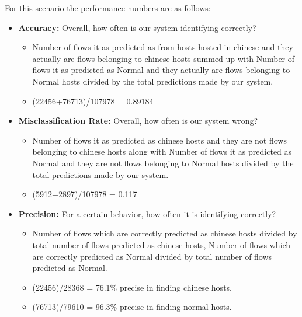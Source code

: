 For this scenario the performance numbers are as follows:

\begin{itemize}
	\item \textbf{Accuracy:} Overall, how often is our system identifying correctly?
	\begin{itemize}
		
		\item Number of flows it as predicted as from hosts hosted in chinese and they  actually are flows belonging to chinese hosts summed up with Number of flows it as predicted as Normal and they  actually are flows belonging to Normal hosts divided by the total predictions made by our system.
		
		\item (22456+76713)/107978 = 0.89184
		
	\end{itemize}
	
	\item \textbf{Misclassification Rate:} Overall, how often is our system wrong?
	\begin{itemize}
		
		\item Number of flows it as predicted as chinese hosts and they are not flows belonging to chinese hosts along with Number of flows it as predicted as Normal and they are not flows belonging to Normal hosts divided by the total predictions made by our system.
		
		\item (5912+2897)/107978 = 0.117
	\end{itemize}
	
	\item \textbf{Precision:} For a certain behavior, how often it is identifying correctly?
	\begin{itemize}
		
		\item Number of flows which are correctly predicted as chinese hosts divided by total number of flows predicted as chinese hosts, Number of flows which are correctly predicted as Normal divided by total number of flows predicted as Normal. 
		
		\item (22456)/28368 = 76.1\% precise in finding chinese hosts.
		
		\item (76713)/79610 = 96.3\% precise in finding normal hosts.
		
	\end{itemize}
	
\end{itemize}




